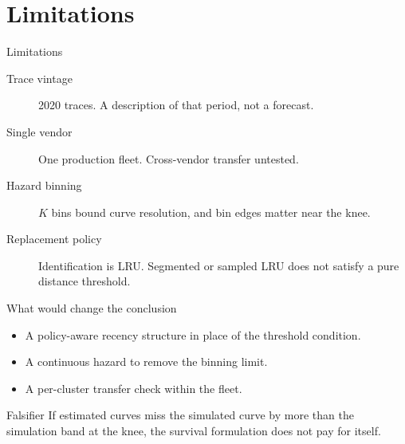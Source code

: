 \section{Limitations}

\begin{frame}{Limitations}
  \begin{description}
    \item[Trace vintage] 2020 traces. A description of that period, not a
      forecast.
    \item[Single vendor] One production fleet. Cross-vendor transfer untested.
    \item[Hazard binning] $K$ bins bound curve resolution, and bin edges matter
      near the knee.
    \item[Replacement policy] Identification is LRU. Segmented or sampled LRU
      does not satisfy a pure distance threshold.
  \end{description}
\end{frame}

\begin{frame}{What would change the conclusion}
  \begin{itemize}
    \item A policy-aware recency structure in place of the threshold condition.
    \item A continuous hazard to remove the binning limit.
    \item A per-cluster transfer check within the fleet.
  \end{itemize}
  \vspace{1em}
  \begin{block}{Falsifier}
    If estimated curves miss the simulated curve by more than the simulation
    band at the knee, the survival formulation does not pay for itself.
  \end{block}
\end{frame}
